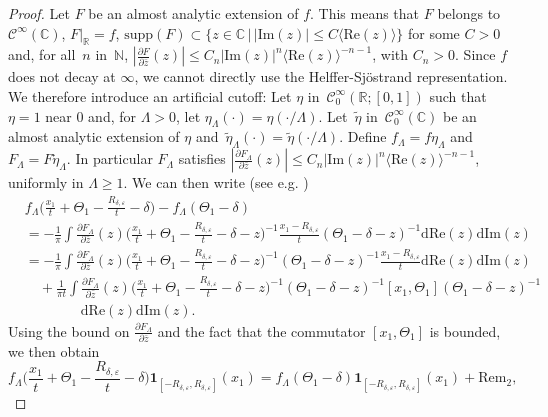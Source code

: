 \documentclass[12pt]{article}
\theoremstyle{plain}
\begin{document}
\begin{proof}
    Let $F$ be an almost analytic extension of $f$. This means that $F$ belongs to $\mathcal{C}^\infty(\mathbb{C})$, $F|_{\mathbb{R}}=f$, $\mathrm{supp}(F)\subset\{z\in\mathbb{C}\, |\, |\mathrm{Im}(z)|\le C\langle\mathrm{Re}(z)\rangle\}$ for some $C>0$ and, for all~$n$ in~$\mathbb{N}$, $|\frac{\partial F}{\partial \bar z}(z)|\le C_n|\mathrm{Im}(z)|^n\langle\mathrm{Re}(z)\rangle^{-n-1}$, with $C_n>0$. Since $f$ does not decay at $\infty$, we cannot directly use the Helffer-Sj\"ostrand representation. We therefore introduce an artificial cutoff: Let $\eta$ in~$\mathcal{C}_0^\infty(\mathbb{R};[0,1])$ such that $\eta=1$ near $0$ and, for $\Lambda>0$, let $\eta_\Lambda(\cdot)=\eta(\cdot/\Lambda)$. Let~$\tilde\eta$ in~$\mathcal{C}_0^\infty(\mathbb{C})$ be an almost analytic extension of $\eta$ and~$\tilde\eta_\Lambda(\cdot)=\tilde\eta(\cdot/\Lambda)$. Define $f_\Lambda=f\eta_\Lambda$ and~$ F_\Lambda=F\tilde \eta_\Lambda$. In particular $F_\Lambda$ satisfies $|\frac{\partial F_\Lambda}{\partial \bar z}(z)|\le C_n|\mathrm{Im}(z)|^n\langle\mathrm{Re}(z)\rangle^{-n-1}$, uniformly in $\Lambda\ge1$. We can then write (see e.g. \cite{derezinski_ger})
\begin{align*}
	&	f_\Lambda\Big(\frac{x_1}{t}+\Theta_1-\frac{R_{\delta,\varepsilon}}{t}-\delta\Big)-f_\Lambda(\Theta_1-\delta)\\
	&=-\frac1\pi\int \frac{\partial F_\Lambda}{\partial \bar z}(z) \Big(\frac{x_1}{t}+\Theta_1-\frac{R_{\delta,\varepsilon}}{t}-\delta-z\Big)^{-1}\frac{x_1-R_{\delta,\varepsilon}}{t}(\Theta_1-\delta-z)^{-1} \mathrm{d}\mathrm{Re}(z)\mathrm{d}\mathrm{Im}(z) \\
&=-\frac1\pi\int \frac{\partial F_\Lambda}{\partial \bar z}(z) \Big(\frac{x_1}{t}+\Theta_1-\frac{R_{\delta,\varepsilon}}{t}-\delta-z\Big)^{-1}(\Theta_1-\delta-z)^{-1}\frac{x_1-R_{\delta,\varepsilon}}{t} \mathrm{d}\mathrm{Re}(z)\mathrm{d}\mathrm{Im}(z) \\
	&\quad +\frac1{\pi t}\int \frac{\partial F_\Lambda}{\partial \bar z}(z) \Big(\frac{x_1}{t}+\Theta_1-\frac{R_{\delta,\varepsilon}}{t}-\delta-z\Big)^{-1}(\Theta_1-\delta-z)^{-1}[x_1,\Theta_1](\Theta_1-\delta-z)^{-1}\\
	&\qquad\qquad\mathrm{d}\mathrm{Re}(z)\mathrm{d}\mathrm{Im}(z).
\end{align*}
Using the bound on $\frac{\partial F_\Lambda}{\partial\bar z}$ and the fact that the commutator $[x_1,\Theta_1]$ is bounded, we then obtain
    \begin{equation*}
        f_\Lambda\Big(\frac{x_1}{t}+\Theta_1-\frac{R_{\delta,\varepsilon}}{t}-\delta\Big) \mathbf{1}_{[-R_{\delta,\varepsilon},R_{\delta,\varepsilon}]}(x_1)=f_\Lambda(\Theta_1-\delta) \mathbf{1}_{[-R_{\delta,\varepsilon},R_{\delta,\varepsilon}]}(x_1)+\mathrm{Rem}_2,

\end{equation*}
\end{proof}
\end{document}
